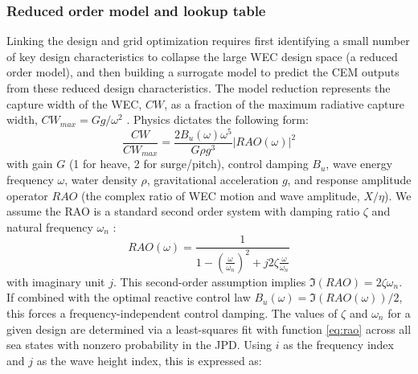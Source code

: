 \documentclass[10pt,twoside]{article}
\begin{document}
\subsubsection{Reduced order model and lookup table}
Linking the design and grid optimization requires first identifying a small number of key design characteristics to collapse the large WEC design space (a reduced order model), and then building a surrogate model to predict the CEM outputs from these reduced design characteristics. The model reduction represents the capture width of the WEC, $CW$, as a fraction of the maximum radiative capture width, $CW_{max}=Gg/\omega^2$ \cite{zou_practical_2023}. Physics dictates the following form:
\begin{equation}
    \label{eq:CW-fraction}
    \frac{CW}{CW_{max}} = \frac{2 B_u(\omega) \omega^5}{G \rho g^3} |RAO(\omega)|^2
\end{equation}
with gain $G$ (1 for heave, 2 for surge/pitch), control damping $B_u$, wave energy frequency $\omega$, water density $\rho$, gravitational acceleration $g$, and response amplitude operator $RAO$ (the complex ratio of WEC motion and wave amplitude, $X/\eta$).
We assume the RAO is a standard second order system with damping ratio $\zeta$ and natural frequency $\omega_n$ \cite{franklin2014feedback}:
\begin{equation}
    \label{eq:rao}
    RAO(\omega) = \frac{1}{1-\left(\frac{\omega}{\omega_n}\right)^2 + j 2 \zeta \frac{\omega}{\omega_n}}
\end{equation}
with imaginary unit $j$.
This second-order assumption implies $\Im(RAO)=2\zeta \omega_n$.
If combined with the optimal reactive control law $B_u(\omega) = \Im(RAO(\omega))/2$, this forces a frequency-independent control damping.
The values of $\zeta$ and $\omega_n$ for a given design are determined via a least-squares fit with function \eqref{eq:rao} across all sea states with nonzero probability in the JPD.
Using $i$ as the frequency index and $j$ as the wave height index, this is expressed as:
\end{document}
